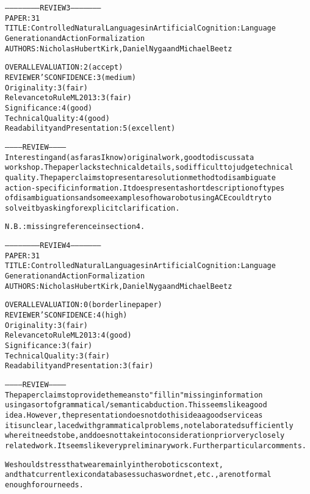 \documentclass[oribibl]{llncs}
\newcommand{\comment}[1]{{\color{red} #1}}
\newcommand{\tick}{{\color{red}\ding{52}}}
\begin{document}
\begin{alltt}
----------------------- REVIEW 3 ---------------------
PAPER: 31
TITLE: Controlled Natural Languages in Artificial Cognition: Language 
Generation and Action Formalization
AUTHORS: Nicholas Hubert Kirk, Daniel Nyga and Michael Beetz

OVERALL EVALUATION: 2 (accept)
REVIEWER'S CONFIDENCE: 3 (medium)
Originality: 3 (fair)
Relevance to RuleML 2013: 3 (fair)
Significance: 4 (good)
Technical Quality: 4 (good)
Readability and Presentation: 5 (excellent)

----------- REVIEW -----------
Interesting and (as far as I know) original work, good to discuss at a 
workshop. The paper lacks technical details, so difficult to judge technical 
quality. The paper claims to present a resolution method to disambiguate 
action-specific information. It does present a short description of types 
of disambiguations and some examples of how a robot using ACE could try to 
solve it by asking for explicit clarification.

N.B.: missing reference in section 4. \tick

----------------------- REVIEW 4 ---------------------
PAPER: 31
TITLE: Controlled Natural Languages in Artificial Cognition: Language 
Generation and Action Formalization
AUTHORS: Nicholas Hubert Kirk, Daniel Nyga and Michael Beetz

OVERALL EVALUATION: 0 (borderline paper)
REVIEWER'S CONFIDENCE: 4 (high)
Originality: 3 (fair)
Relevance to RuleML 2013: 4 (good)
Significance: 3 (fair)
Technical Quality: 3 (fair)
Readability and Presentation: 3 (fair)

----------- REVIEW -----------
The paper claims to provide the means to "fill in" missing information 
using a sort of grammatical/semantic abduction.  This seems like a good 
idea.  However, the presentation does not do this idea a good service as 
it is unclear, laced with grammatical problems, not elaborated sufficiently 
where it needs to be, and does not take into consideration prior very closely
 related work.  It seems like very preliminary work.  Further particular comments.
 
 \comment{We should stress that we are mainly in the robotics context,
 and that current lexicon databases such as wordnet, etc., are not formal
 enough for our needs.}


\end{alltt}
\end{document}
